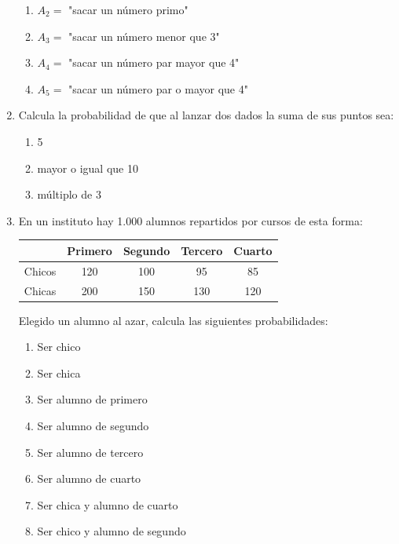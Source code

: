 \documentclass[letterpaper,fleqn]{article}
\begin{document}
\begin{enumerate}
\begin{enumerate}
 \item $A_{2}=$ "sacar un número primo"
 \item $A_{3}=$ "sacar un número menor que 3"
 \item $A_{4}=$ "sacar un número par mayor que 4"
 \item $A_{5}=$ "sacar un número par o mayor que 4" 
 \end{enumerate}
 \item Calcula la probabilidad de que al lanzar dos dados la suma de sus puntos sea:
 \begin{enumerate}
 \item 5
 \item mayor o igual que 10
 \item múltiplo de 3
 \end{enumerate}
 \item En un instituto hay 1.000 alumnos repartidos por cursos de esta forma:
\begin{center}
\begin{tabular}{|c|c|c|c|c|}
\hline 
 & Primero & Segundo & Tercero & Cuarto \\ 
\hline 
Chicos & 120 & 100 & 95 & 85 \\ 
\hline 
Chicas & 200 & 150 & 130 & 120 \\ 
\hline 
\end{tabular} 
\end{center}
Elegido un alumno al azar, calcula las siguientes probabilidades:
\begin{enumerate}
\item Ser chico
\item Ser chica
\item Ser alumno de primero
\item Ser alumno de segundo
\item Ser alumno de tercero
\item Ser alumno de cuarto
\item Ser chica y alumno de cuarto
\item Ser chico y alumno de segundo
\end{enumerate}
 \end{enumerate}
\end{document}
